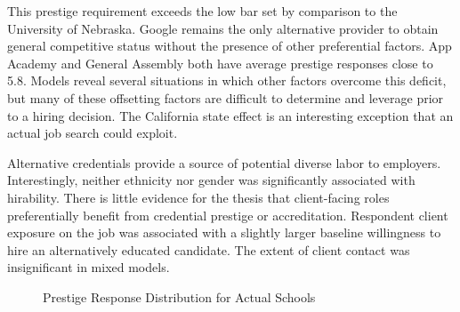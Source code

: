 \documentclass[review]{elsarticle}
\begin{document}
This prestige requirement exceeds the low bar set by comparison to the University of Nebraska.
Google remains the only alternative provider to obtain general competitive status without the presence of other preferential factors.
App Academy and General Assembly both have average prestige responses close to 5.8.
Models reveal several situations in which other factors overcome this deficit,
but many of these offsetting factors are difficult to determine and leverage prior to a hiring decision.
The California state effect is an interesting exception that an actual job search could exploit.

Alternative credentials provide a source of potential diverse labor to employers.
Interestingly, neither ethnicity nor gender was significantly associated with hirability.
There is little evidence for the thesis that client-facing roles preferentially benefit from credential prestige or accreditation.
Respondent client exposure on the job was associated with a slightly larger baseline willingness to hire an alternatively educated candidate.
The extent of client contact was insignificant in mixed models.

\begin{figure}[h!]
    \centering
    \caption{Prestige Response Distribution for Actual Schools}
    \label{fig:var_results}
\end{figure}
\end{document}

